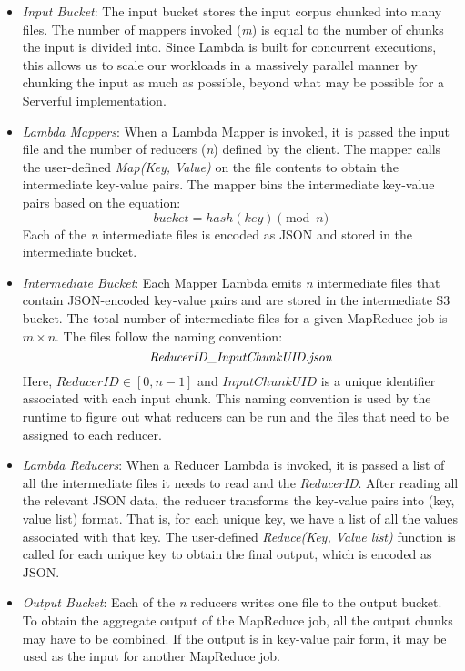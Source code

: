 \begin{itemize}
    \item \emph{Input Bucket}: The input bucket stores the input corpus chunked into many files. The number of mappers invoked (\emph{m}) is equal to the number of chunks the input is divided into. Since Lambda is built for concurrent executions, this allows us to scale our workloads in a massively parallel manner by chunking the input as much as possible, beyond what may be possible for a Serverful implementation.
    
    \item \emph{Lambda Mappers}: When a Lambda Mapper is invoked, it is passed the input file and the number of reducers (\emph{n}) defined by the client. The mapper calls the user-defined \emph{Map(Key, Value)} on the file contents to obtain the intermediate key-value pairs. The mapper bins the intermediate key-value pairs based on the equation:
    \[bucket = hash(key) \pmod{n}\]
    Each of the \emph{n} intermediate files is encoded as JSON and stored in the intermediate bucket.
    
    \item \emph{Intermediate Bucket}: Each Mapper Lambda emits \emph{n} intermediate files that contain JSON-encoded key-value pairs and are stored in the intermediate S3 bucket. The total number of intermediate files for a given MapReduce job is $m\times{n}$. The files follow the naming convention:
    \[\emph{ReducerID\_InputChunkUID.json}\]
    Here, $ReducerID \in [0,n-1]$ and $InputChunkUID$ is a unique identifier associated with each input chunk. This naming convention is used by the runtime to figure out what reducers can be run and the files that need to be assigned to each reducer.
    
    \item \emph{Lambda Reducers}: When a Reducer Lambda is invoked, it is passed a list of all the intermediate files it needs to read and the \emph{ReducerID}. After reading all the relevant JSON data, the reducer transforms the key-value pairs into (key, value list) format. That is, for each unique key, we have a list of all the values associated with that key. The user-defined \emph{Reduce(Key, Value list)} function is called for each unique key to obtain the final output, which is encoded as JSON.
    
    \item \emph{Output Bucket}: Each of the \emph{n} reducers writes one file to the output bucket. To obtain the aggregate output of the MapReduce job, all the output chunks may have to be combined. If the output is in key-value pair form, it may be used as the input for another MapReduce job.
    

\end{itemize}
